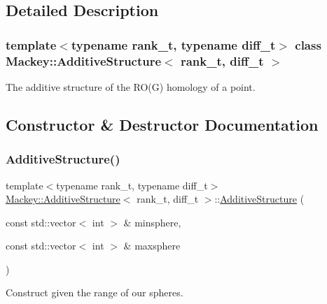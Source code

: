 \subsection{Detailed Description}
\subsubsection*{template$<$typename rank\+\_\+t, typename diff\+\_\+t$>$\newline
class Mackey\+::\+Additive\+Structure$<$ rank\+\_\+t, diff\+\_\+t $>$}

The additive structure of the R\+O(\+G) homology of a point. 

\subsection{Constructor \& Destructor Documentation}
\mbox{\label{classMackey_1_1AdditiveStructure_a6e6b98b9df433129320045abd5e50bab}} 
\subsubsection{\texorpdfstring{Additive\+Structure()}{AdditiveStructure()}\hspace{0.1cm}{\footnotesize\ttfamily [1/2]}}
{\footnotesize\ttfamily template$<$typename rank\+\_\+t, typename diff\+\_\+t$>$ \\
\hyperlink{classMackey_1_1AdditiveStructure}{Mackey\+::\+Additive\+Structure}$<$ rank\+\_\+t, diff\+\_\+t $>$\+::\hyperlink{classMackey_1_1AdditiveStructure}{Additive\+Structure} (\begin{DoxyParamCaption}\item[{const std\+::vector$<$ int $>$ \&}]{minsphere,  }\item[{const std\+::vector$<$ int $>$ \&}]{maxsphere }\end{DoxyParamCaption})\hspace{0.3cm}{\ttfamily [inline]}}



Construct given the range of our spheres. 

